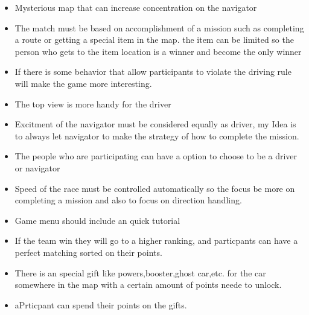 \documentclass[a4paper, answers,fleqn]{exam}
\begin{document}
\begin{itemize}
	\item Mysterious map that can increase concentration on the navigator
	\item The match must be based on accomplishment of a mission such as completing a route or getting a special item in the map. the item can be limited so the person who gets to the item location is a winner and become the only winner
	\item If there is some behavior that allow participants to violate the driving rule will make the game more interesting.
	\item The top view is more handy for the driver
	\item Excitment of  the navigator must be considered equally as driver, my Idea is to always let navigator to make the strategy of how to complete the mission.
	\item The people who are participating can have a option to choose to be a driver or navigator
	\item Speed of the race must be controlled automatically so the focus be more on completing a mission and also to focus on direction handling.
	\item Game menu should include an quick tutorial 
	\item If the team win they will go to a higher ranking, and particpants can have a perfect matching sorted on their points.
	\item There is an special gift like powers,booster,ghost car,etc. for the car somewhere in the map with a certain amount of points neede to unlock.
	\item aPrticpant can spend their points on the gifts.

\end{itemize}
\end{document}
